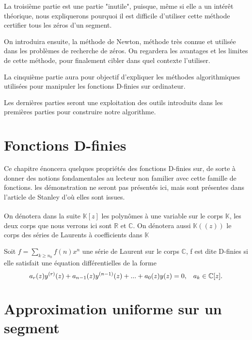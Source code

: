 \documentclass[a4paper,10.5pt]{article}
\begin{document}
	La troisième partie est une partie "inutile", puisque, même si elle a un intérêt théorique, nous expliquerons pourquoi il est difficile d'utiliser cette méthode certifier tous les zéros d'un segment.
	
	On introduira ensuite, la méthode de Newton, méthode très connue et utilisée dans les problèmes de recherche de zéros. On regardera les avantages et les limites de cette méthode, pour finalement cibler dans quel contexte l'utiliser.
	
	La cinquième partie aura pour objectif d'expliquer les méthodes algorithmiques utilisées pour manipuler les fonctions D-finies sur ordinateur.
	
	Les dernières parties seront une exploitation des outils introduits dans les premières parties pour construire notre algorithme. 
	
	
	\section{Fonctions D-finies}
	Ce chapitre énoncera quelques propriétés des fonctions D-finies sur, de sorte à donner des notions fondamentales au lecteur non familier avec cette famille de fonctions. les démonstration ne seront pas présentés ici, mais sont présentes dans l'article de Stanley d'où elles sont issues.\\
	\\
	On dénotera dans la suite $\mathbb{K}[z]$ les polynômes à une variable sur le corps $\mathbb{K}$, les deux corps que nous verrons ici sont $\mathbb{R}$ et $\mathbb{C}$. On dénotera aussi $\mathbb{K}((z))$ le corps des séries de Laurents à coefficients dans $\mathbb{K}$
	
	\begin{definition}
		Soit $f=\sum_{k\geq n_0}f(n)x^n$ une série de Laurent sur le corps $\mathbb{C}$, f est dite  D-finies si elle satisfait une équation différentielles de la forme
		\begin{equation}
		a_{r}(z)y^{(r)}(z)+a_{n-1}(z)y^{(n-1)}(z)+...+a_{0}(z)y(z)=0, \hspace{3mm} a_{k}\in \mathbb{C}[z].
		\end{equation}
	\end{definition}
	
	
	
 	
 	
	
	
	
	
	\section{Approximation uniforme sur un segment}
	
\end{document}
